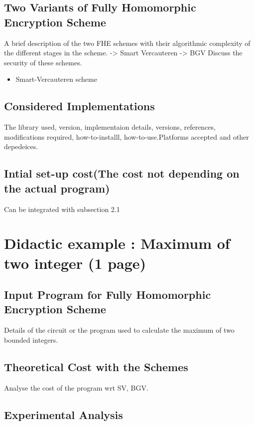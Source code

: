 \documentclass{acm_proc_article-sp}
\begin{document}
\subsection{Two Variants of Fully Homomorphic Encryption Scheme}
A brief description of the two FHE schemes with their algorithmic complexity of the different stages in the scheme. 
-> Smart Vercauteren
-> BGV
Discuss the security of these schemes.



\begin{itemize}
\item Smart-Vercauteren scheme


\end{itemize}
\subsection{Considered Implementations}

The library used, version, implementaion details, versions, references, modifications required, how-to-installl, how-to-use.Platforms accepted and other depedeices.

\subsection{Intial set-up cost(The cost not depending on the actual program)}

Can be integrated with subsection 2.1 

\section{ Didactic example :  Maximum of two integer (1 page)}



\subsection{Input Program for Fully Homomorphic Encryption Scheme}

Details of the circuit or the program used to calculate the maximum of two bounded integers.


\subsection{Theoretical Cost with the Schemes}

Analyse the cost of the program wrt SV, BGV. 

\subsection{Experimental Analysis}
\end{document}
